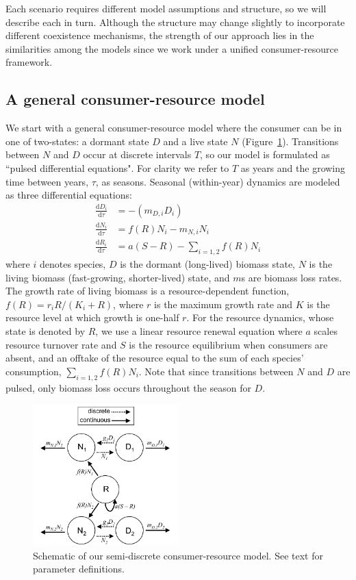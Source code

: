 \documentclass[12pt]{article}
\begin{document}
Each scenario requires different model assumptions and structure, so we will describe each in turn. Although the structure may change slightly to incorporate different coexistence mechanisms, the strength of our approach lies in the similarities among the models since we work under a unified consumer-resource framework.

\subsection{A general consumer-resource model}
We start with a general consumer-resource model where the consumer can be in one of two-states: a dormant state $D$ and a live state $N$ (Figure~\ref{fig:model}). Transitions between $N$ and $D$ occur at discrete intervals $T$, so our model is formulated as ``pulsed differential equations". For clarity we refer to $T$ as years and the growing time between years, $\tau$, as seasons. Seasonal (within-year) dynamics are modeled as three differential equations:
\begin{align}
\frac{\text{d}D_{i}}{\text{d}\tau} &= -(m_{D,i}D_{i})\\
\frac{\text{d}N_{i}}{\text{d}\tau} &= f(R)N_{i} - m_{N,i}N_{i}\\
\frac{\text{d}R_{i}}{\text{d}\tau} &= a(S - R) - \sum\limits_{i=1,2}f(R)N_{i}
\end{align}
where $i$ denotes species, $D$ is the dormant (long-lived) biomass state, $N$ is the living biomass (fast-growing, shorter-lived) state, and $m$s are biomass loss rates. The growth rate of living biomass is a resource-dependent function, $f(R) = r_{i}R/(K_{i}+R)$, where $r$ is the maximum growth rate and $K$ is the resource level at which growth is one-half $r$. For the resource dynamics, whose state is denoted by $R$, we use a linear resource renewal equation where $a$ scales resource turnover rate and $S$ is the resource equilibrium when consumers are absent, and an offtake of the resource equal to the sum of each species' consumption, $\sum_{i=1,2}f(R)N_{i}$. Note that since transitions between $N$ and $D$ are pulsed, only biomass loss occurs throughout the season for $D$.

\begin{figure}
\centering
\includegraphics[width=0.5\textwidth]{"SemiDiscreteModel"}
\caption{Schematic of our semi-discrete consumer-resource model. See text for parameter definitions.}
 \label{fig:model}
\end{figure}
\end{document}
